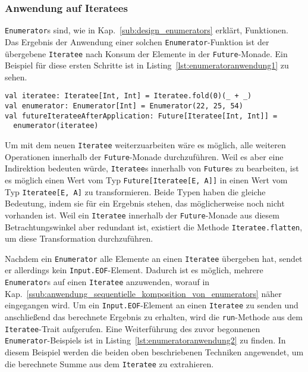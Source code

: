 

\subsubsection{Anwendung auf Iteratees} %
\label{ssub:anwendung_auf_iteratees}

\lstinline|Enumerator|s sind, wie in Kap.~\ref{sub:design_enumerators} erklärt, Funktionen.
Das Ergebnis der Anwendung einer solchen \lstinline|Enumerator|-Funktion ist der übergebene \lstinline|Iteratee| nach Konsum der Elemente in der \lstinline|Future|-Monade.
Ein Beispiel für diese ersten Schritte ist in Listing~\ref{lst:enumeratoranwendung1} zu sehen.

\begin{lstlisting}[caption=Anwendung eines Enumerators auf einen Iteratee, label=lst:enumeratoranwendung1]
val iteratee: Iteratee[Int, Int] = Iteratee.fold(0)(_ + _)
val enumerator: Enumerator[Int] = Enumerator(22, 25, 54)
val futureIterateeAfterApplication: Future[Iteratee[Int, Int]] =
  enumerator(iteratee)
\end{lstlisting}


Um mit dem neuen \lstinline|Iteratee| weiterzuarbeiten wäre es möglich, alle weiteren Operationen innerhalb der \lstinline|Future|-Monade durchzuführen.
Weil es aber eine Indirektion bedeuten würde, \lstinline|Iteratee|s innerhalb von \lstinline|Future|s zu bearbeiten, ist es möglich einen Wert vom Typ \lstinline|Future[Iteratee[E, A]]| in einen Wert vom Typ \lstinline|Iteratee[E, A]| zu transformieren.
Beide Typen haben die gleiche Bedeutung, indem sie für ein Ergebnis stehen, das möglicherweise noch nicht vorhanden ist.
Weil ein \lstinline|Iteratee| innerhalb der \lstinline|Future|-Monade aus diesem Betrachtungswinkel aber redundant ist, existiert die Methode \lstinline|Iteratee.flatten|, um diese Transformation durchzuführen.


Nachdem ein \lstinline|Enumerator| alle Elemente an einen \lstinline|Iteratee| übergeben hat, sendet er allerdings kein \lstinline|Input.EOF|-Element.
Dadurch ist es möglich, mehrere \lstinline|Enumerator|s auf einen \lstinline|Iteratee| anzuwenden, worauf in Kap.~\ref{ssub:anwendung_sequentielle_komposition_von_enumerators} näher eingegangen wird.
Um ein \lstinline|Input.EOF|-Element an einen \lstinline|Iteratee| zu senden und anschließend das berechnete Ergebnis zu erhalten, wird die \lstinline|run|-Methode aus dem \lstinline|Iteratee|-Trait aufgerufen.
Eine Weiterführung des zuvor begonnenen \lstinline|Enumerator|-Beispiels ist in Listing~\ref{lst:enumeratoranwendung2} zu finden.
In diesem Beispiel werden die beiden oben beschriebenen Techniken angewendet, um die berechnete Summe aus dem \lstinline|Iteratee| zu extrahieren.

